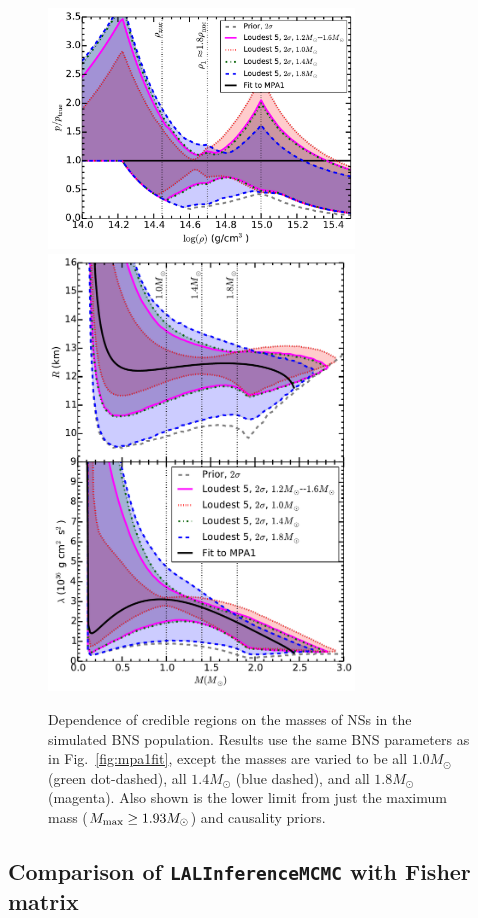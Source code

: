 \documentclass[twocolumn,prd,amssymb,aps,nofootinbib,showpacs,epsf]{revtex4}
\begin{document}
\begin{figure}[!htb]
\begin{center}
\includegraphics[width=3.2in]{LALMCMCmpa1FitTaylorF2VaryMassperror.pdf}\\
\includegraphics[width=3.2in]{LALMCMCmpa1FitTaylorF2VaryMassRadiuslambda.pdf}
\caption{Dependence of credible regions on the masses of NSs in the simulated BNS population. Results use the same BNS parameters as in Fig.~\ref{fig:mpa1fit}, except the masses are varied to be all $1.0M_\odot$ (green dot-dashed), all $1.4M_\odot$ (blue dashed), and all $1.8M_\odot$ (magenta). Also shown is the lower limit from just the maximum mass ($M_{\rm \max} \geq 1.93M_\odot$) and causality priors.}
\label{fig:popmass}
\end{center}
\end{figure}


\subsection{Comparison of \texttt{LALInferenceMCMC} with Fisher matrix}
\label{sec:fisher}
\end{document}
